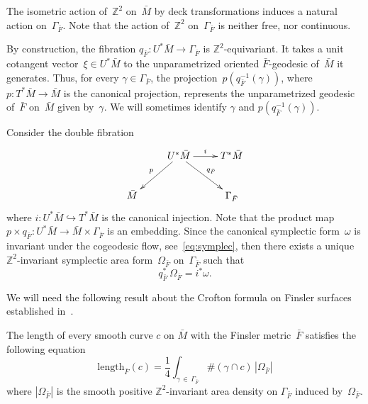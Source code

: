 \documentclass[AHL,Unicode,longabstracts,published]{cedram}
\newcommand{\Z}{\mathbb{Z}}
\newcommand{\R}{\mathbb{R}}
\newcommand{\length}{\mathrm{length}}
\begin{document}
The isometric action of~$\Z^2$ on~$\bar{M}$ by deck transformations induces a natural action on~$\Gamma_{\bar{F}}$. Note that the action of~$\Z^2$ on~$\Gamma_{\bar{F}}$ is neither free, nor continuous.

By construction, the fibration $q_{\bar{F}}: U^* \bar{M} \to \Gamma_{\bar{F}}$ is $\Z^2$-equivariant. It takes a unit cotangent vector~$\xi \in U^*\bar{M}$ to the unparametrized oriented $\bar{F}$-geodesic of~$\bar{M}$ it generates. Thus, for every $\gamma \in \Gamma_{\bar{F}}$, the projection~$p(q_{\bar{F}}^{-1}(\gamma))$, where $p:T^{*}\bar{M} \rightarrow \bar{M}$ is the canonical projection, represents the unparametrized geodesic of~$\bar{F}$ on~$\bar{M}$ given by~$\gamma$. We will sometimes identify $\gamma$ and $p(q_{\bar{F}}^{-1}(\gamma))$. 

Consider the double fibration
\[
\xymatrix{ & U^* \bar{M} \ar[dl]_p \ar[dr]^{q_{\bar{F}}} \ar[r]^i & T^*\bar{M} \\
\bar{M} & & \Gamma_{\bar{F}}}
\]
where $i:U^{*}\bar{M}\hookrightarrow T^{*}\bar{M}$ is the canonical injection. Note that the product map $p\times q_{\bar{F}}:U^{*}\bar{M} \rightarrow \bar{M}\times\Gamma_{\bar{F}}$ is an embedding. Since the canonical symplectic form~$\omega$ is invariant under the cogeodesic flow, see~\eqref{eq:symplec}, then there exists a unique $\Z^2$-invariant symplectic area form~$\Omega_{\bar{F}}$ on~$\Gamma_{\bar{F}}$ such that
\begin{equation}\label{symlequ}
q_{\bar{F}}^{*} \, \Omega_{\bar{F}}=i^{*} \omega.
\end{equation}

We will need the following result about the Crofton formula on Finsler surfaces established in~\cite[Theorem~5.2]{AB}.

\begin{theo}\label{theo:crofton}
The length of every smooth curve $c$ on $\bar{M}$ with the Finsler metric~$\bar{F}$ satisfies the following equation
\begin{equation}\label{lengthequ}
\length_{\bar{F}}(c)=\frac{1}{4}\int_{\gamma\,\in\,\Gamma_{\bar{F}}}\#(\gamma\cap c)\, |\Omega_{\bar{F}}|
\end{equation}
where $|\Omega_{\bar{F}}|$ is the smooth positive $\Z^2$-invariant area density on $\Gamma_{\bar{F}}$ induced by~$\Omega_{\bar{F}}$.
\end{theo}
\end{document}
